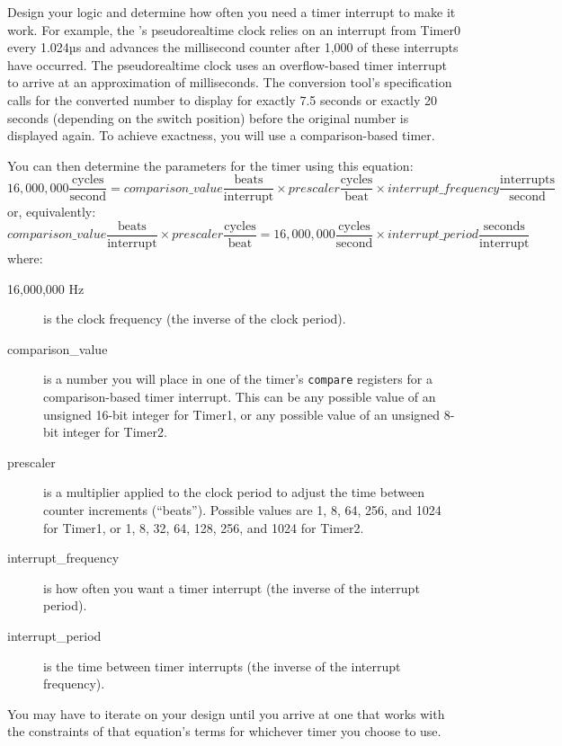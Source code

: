 Design your logic and determine how often you need a timer interrupt to make it
work. For example, the \nano's pseudorealtime clock relies on an interrupt from
Timer0 every 1.024µs and advances the millisecond counter after 1,000 of these
interrupts have occurred. The pseudorealtime clock uses an overflow-based timer
interrupt to arrive at an approximation of milliseconds. The conversion tool's
specification calls for the converted number to display for exactly 7.5 seconds
or exactly 20 seconds (depending on the switch position) before the original
number is displayed again. To achieve exactness, you will use a comparison-based
timer.

You can then determine the parameters for the timer using
this equation:
\[
16,000,000 \frac{\mathrm{cycles}}{\mathrm{second}} =
    comparison\_value \frac{\mathrm{beats}}{\mathrm{interrupt}} \times
    prescaler \frac{\mathrm{cycles}}{\mathrm{beat}} \times
    interrupt\_frequency \frac{\mathrm{interrupts}}{\mathrm{second}}
\]
or, equivalently:
\[
    comparison\_value \frac{\mathrm{beats}}{\mathrm{interrupt}} \times
    prescaler \frac{\mathrm{cycles}}{\mathrm{beat}} =
    16,000,000 \frac{\mathrm{cycles}}{\mathrm{second}} \times
    interrupt\_period \frac{\mathrm{seconds}}{\mathrm{interrupt}}
\]
where:
    \begin{description}
    \item [16,000,000 Hz] is the clock frequency (the inverse of the clock
        period).
    \item [comparison\_value] is a number you will place in one of the
        timer's \texttt{compare} registers for a comparison-based timer
        interrupt. This can be any possible value of an unsigned 16-bit integer
        for Timer1, or any possible value of an unsigned 8-bit integer for
        Timer2.
    \item [prescaler] is a multiplier applied to the clock period to adjust the
        time between counter increments (``beats''). Possible values are 1, 8,
        64, 256, and 1024 for Timer1, or 1, 8, 32, 64, 128, 256, and 1024 for
        Timer2.
    \item [interrupt\_frequency] is how often you want a timer interrupt (the
        inverse of the interrupt period).
    \item [interrupt\_period] is the time between timer interrupts (the
        inverse of the interrupt frequency).
    \end{description}

You may have to iterate on your design until you arrive at one that works with
the constraints of that equation's terms for whichever timer you choose to use.

